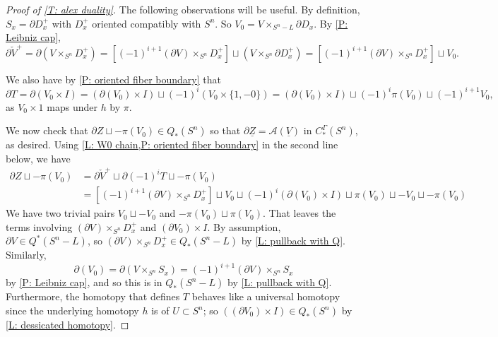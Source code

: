 \documentclass[12pt]{article}
\theoremstyle{plain}
\theoremstyle{definition}
\theoremstyle{remark}
\newcommand{\uV}{\underline{V}}
\newcommand{\bd}{\partial}
\newcommand{\mc}[1]{\mathcal{#1}}
\begin{document}
\begin{proof}[Proof of \cref{T: alex duality}]
The following observations will be useful.
By definition, $S_x = \bd D_x^+$ with $D_x^+$ oriented compatibly with $S^n$.
So $V_0 = V \times_{S^n-L} \bd D_x$.
By \cref{P: Leibniz cap}, $$\bd \check V^+ = \bd(V \times_{S^n} D_x^+) = \left[(-1)^{i+1} (\bd V) \times_{S^n} D_x^+\right] \sqcup (V \times_{S^n} \bd D_x^+) = \left[(-1)^{i+1} (\bd V) \times_{S^n} D_x^+\right] \sqcup V_0.$$
\begin{comment}Similarly,  $$\bd \check V^+ = \bd(V \times_{S^n} M_x) = \left[(-1)^{i+1} (\bd V) \times_{S^n} D_x\right] \sqcup (V \times_{S^n} \bd M_x)=(-1)^{i+1} ((\bd V)^+)^\vee \sqcup -V_0.$$
\end{comment}
We also have by \cref{P: oriented fiber boundary} that
$$\bd T = \bd (V_0 \times I) = (\bd (V_0) \times I) \sqcup (-1)^{i} (V_0 \times \{1,-0\}) =  (\bd (V_0) \times I) \sqcup (-1)^i\pi(V_0)\sqcup (-1)^{i+1} V_0,$$
as $V_0 \times 1$ maps under $h$ by $\pi$.

\begin{comment}
DO I NEED THIS:::
So, $V_0 = V \times_{S^n} \bd D_x$ represents the same chain as $$\bd(V \times_{S^n} D_x) \sqcup (-1)^{i+1} (\bd V) \times_{S^n} D_x = \bd \check  V^- \sqcup (-1)^{i+1} (\bd V) \times_{S^n} D_x.$$
In particular, the orientation of $V_0$ is the same as the orientation of $\bd \check  V^-$.
\end{comment}



We now check that $\bd Z \sqcup -\pi(V_0) \in Q_*(S^n)$ so that $\bd \underline{Z} = \mc A(\uV)$ in $C_*^\Gamma(S^n)$, as desired.
Using \cref{L: W0 chain,P: oriented fiber boundary} in the second line below, we have
\begin{align*}
\bd Z \sqcup -\pi(V_0) & = \bd \check V^+ \sqcup \bd (-1)^i T \sqcup  -\pi(V_0)\\
&=\left[(-1)^{i+1} (\bd V) \times_{S^n} D_x^+\right] \sqcup V_0 \sqcup
(-1)^i(\bd (V_0) \times I) \sqcup \pi(V_0)\sqcup -V_0
\sqcup  -\pi(V_0)
\end{align*}
We have two trivial pairs $V_0 \sqcup - V_0$ and $ -\pi(V_0) \sqcup \pi(V_0)$.
That leaves the terms involving $(\bd V) \times_{S^n} D_x^+$ and $(\bd V_0) \times I$.
By assumption, $\bd V \in Q^*(S^n-L)$, so $(\bd V) \times_{S^n} D_x^+ \in Q_*(S^n-L)$ by \cref{L: pullback with Q}.
Similarly, $$\bd (V_0) = \bd (V \times_{S^n} S_x) = (-1)^{i+1}(\bd V) \times_{S^n} S_x$$ by \cref{P: Leibniz cap}, and so this is in $Q_*(S^n-L)$ by \cref{L: pullback with Q}.
Furthermore, the homotopy that defines $T$ behaves like a universal homotopy since the underlying homotopy $h$ is of $U \subset S^n$; so $((\bd V_0) \times I) \in Q_*(S^n)$ by \cref{L: dessicated homotopy}.



\end{proof}
\end{document}
